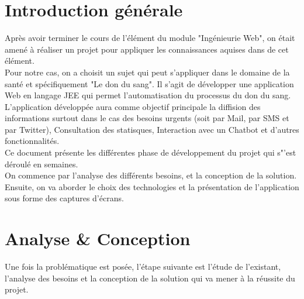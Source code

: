 \documentclass[12pt,a4paper,twoside]{report}
\begin{document}
	\newpage

	\chapter*{Introduction générale}
	\label{chap:introduction}{
		Après avoir terminer le cours de l'élément du module "Ingénieurie Web", on était amené à réaliser un projet pour appliquer les connaissances aquises dans de cet élément.\\
		Pour notre cas, on a choisit un sujet qui peut s'appliquer dans le domaine de la santé et spécifiquement "Le don du sang". Il s'agit de développer une application Web en langage JEE qui permet l'automatisation du processus du don du sang.\\
		L'application développée aura comme objectif principale la diffision des informations surtout dans le cas des besoins urgents (soit par Mail, par SMS et par Twitter), Consultation des statisques, Interaction avec un Chatbot et d'autres fonctionnalités.\\
		Ce document présente les différentes phase de développement du projet qui s"'est déroulé en semaines.\\
		On commence par l'analyse des différents besoins, et la conception de la solution. Ensuite, on va aborder le choix des technologies et la présentation de l'application sous forme des captures d'écrans.

	 }
		
	\newpage
	
	\chapter{Analyse \& Conception}{
		Une fois la problématique est posée, l’étape suivante est l’étude de l’existant, l’analyse des besoins et la conception de la solution qui va mener à la réussite du projet.
	\newpage
	}
\end{document}
